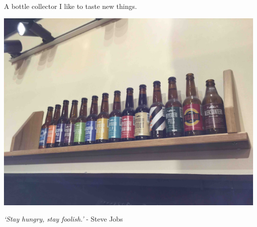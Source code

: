 \documentclass[first=dgreen,second=purple,logo=yellowexc]{aaltoslides}
\begin{document}
\begin{frame}{A bottle collector}
	I like to taste new things.
	\begin{center}
		\includegraphics[scale=0.05,angle=-0,origin=c]{./plots/bottle1.jpg}
	\end{center}
\end{frame}

\begin{frame}{}
	\begin{center}
		{\em `Stay hungry, stay foolish.'} - Steve Jobs
	\end{center}
\end{frame}
\end{document}
